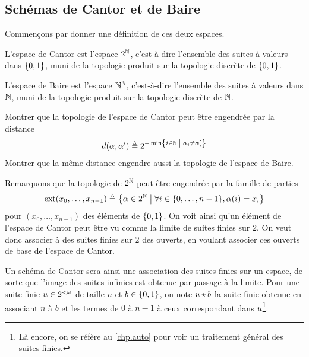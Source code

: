 \subsection{Schémas de Cantor et de Baire}

\noindent
Commençons par donner une définition de ces deux espaces.

\begin{definition}
  L'espace de Cantor est l'espace $2^\mathbb N$, c'est-à-dire l'ensemble des suites à
  valeurs dans $\{0,1\}$, muni de la topologie produit sur la topologie discrète
  de $\{0,1\}$.

  L'espace de Baire est l'espace $\mathbb N^\mathbb N$, c'est-à-dire l'ensemble des suites à
  valeurs dans $\mathbb N$, muni de la topologie produit sur la topologie discrète de
  $\mathbb N$.
\end{definition}

\begin{exercise}
  Montrer que la topologie de l'espace de Cantor peut être engendrée par la
  distance
  \[d(\alpha,\alpha') \triangleq
  2^{-\min\left\{ i \in \mathbb N \;\middle\vert\; \alpha_i \neq\alpha'_i \right\}}\]
  Montrer que la même distance engendre aussi la topologie de l'espace de Baire.
\end{exercise}

Remarquons que la topologie de $2^{\mathbb N}$ peut être engendrée par la famille
de parties
\[\operatorname{ext}(x_0,\ldots,x_{n-1}) \triangleq
\left\{ \alpha \in 2^{\mathbb N} \;\middle\vert\; \forall i \in \{0,\ldots,n - 1\}, \alpha(i) = x_i \right\}\]
pour $(x_0,\ldots,x_{n-1})$ des éléments de $\{0,1\}$. On voit ainsi qu'un élément
de l'espace de Cantor peut être vu comme la limite de suites finies sur $2$.
On veut donc associer à des suites finies sur $2$ des ouverts, en voulant
associer ces ouverts de base de l'espace de Cantor.

Un schéma de Cantor sera ainsi une association des suites finies sur un espace,
de sorte que l'image des suites infinies est obtenue par passage à la limite.
Pour une suite finie $u \in 2^{<\omega}$ de taille $n$ et $b \in \{0,1\}$, on
note $u\mathbin{\star} b$ la suite finie obtenue en associant $n$ à $b$ et les termes
de $0$ à $n-1$ à ceux correspondant dans $u$\footnote{Là encore, on se
réfère au \cref{chp.auto} pour voir un traitement général des suites finies.}.

